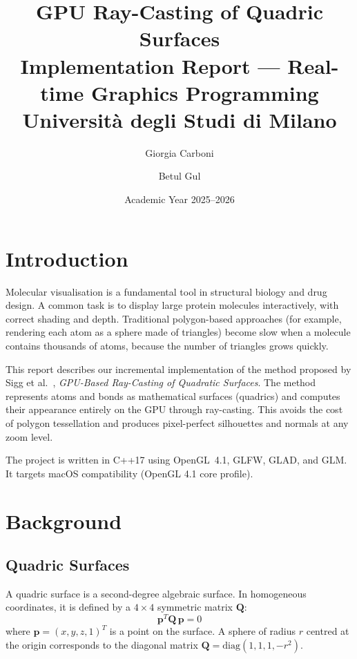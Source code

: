 \documentclass[12pt, a4paper]{article}
\title{
    \textbf{GPU Ray-Casting of Quadric Surfaces} \\
    \large Implementation Report — Real-time Graphics Programming \\
    \large Università degli Studi di Milano
}
\author{Giorgia Carboni \and Betul Gul}
\date{Academic Year 2025--2026}
\begin{document}
\maketitle
\tableofcontents
\newpage

\section{Introduction}

Molecular visualisation is a fundamental tool in structural biology and drug design. A common task is to display large protein molecules interactively, with correct shading and depth. Traditional polygon-based approaches (for example, rendering each atom as a sphere made of triangles) become slow when a molecule contains thousands of atoms, because the number of triangles grows quickly.

This report describes our incremental implementation of the method proposed by Sigg et al.~\cite{sigg2006}, \textit{GPU-Based Ray-Casting of Quadratic Surfaces}. The method represents atoms and bonds as mathematical surfaces (quadrics) and computes their appearance entirely on the GPU through ray-casting. This avoids the cost of polygon tessellation and produces pixel-perfect silhouettes and normals at any zoom level.

The project is written in C++17 using OpenGL~4.1, GLFW, GLAD, and GLM. It targets macOS compatibility (OpenGL 4.1 core profile). 

\section{Background}

\subsection{Quadric Surfaces}

A quadric surface is a second-degree algebraic surface. In homogeneous coordinates, it is defined by a $4 \times 4$ symmetric matrix $\mathbf{Q}$:
\begin{equation}
    \mathbf{p}^T \mathbf{Q} \, \mathbf{p} = 0
    \label{eq:quadric}
\end{equation}
where $\mathbf{p} = (x, y, z, 1)^T$ is a point on the surface. A sphere of radius $r$ centred at the origin corresponds to the diagonal matrix $\mathbf{Q} = \mathrm{diag}(1, 1, 1, -r^2)$.
\end{document}
